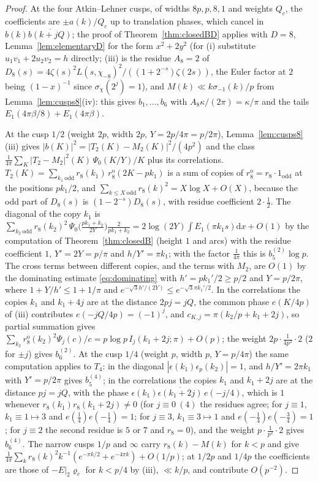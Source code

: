 \documentclass[11pt]{amsart}
\theoremstyle{remark}
\newcommand{\dd}{\mathrm{d}}
\begin{document}
\begin{proof}
At the four Atkin--Lehner cusps, of widths $8p,p,8,1$ and weights $Q_c$, the coefficients are $\pm a(k)/Q_c$ up to translation phases, which cancel in $b(k)\overline{b(k+jQ)}$; the proof of Theorem~\ref{thm:closedBD} applies with $D=8$, Lemma~\ref{lem:elementaryD} for the form $x^2+2y^2$ (for (i) substitute $u_1v_1+2u_2v_2=h$ directly; (iii) is the residue $A_8=2$ of $D_8(s)=4\zeta(s)^2L(s,\chi_{-8})^2/((1+2^{-s})\zeta(2s))$, the Euler factor at $2$ being $(1-x)^{-1}$ since $\sigma_\chi(2^j)=1$), and $M(k)\ll k\sigma_{-1}(k)/p$ from Lemma~\ref{lem:cusps8}(iv): this gives $b_1,\dots,b_6$ with $A_8\kappa/(2\pi)=\kappa/\pi$ and the tails $E_1(4\pi\beta/8)+E_1(4\pi\beta)$.

At the cusp $1/2$ (weight $2p$, width $2p$, $Y=2p/4\pi=p/2\pi$), Lemma~\ref{lem:cusps8}(iii) gives $|b(K)|^2=|T_2(K)-M_2(K)|^2/(4p^2)$ and the class $\frac1{4\pi}\sum_K|T_2-M_2|^2(K)\,\Psi_0(K/Y)/K$ plus its correlations. $T_2(K)=\sum_{k_1\ \mathrm{odd}}r_8(k_1)\,r_8^{\mathrm o}(2K-pk_1)$ is a sum of copies of $r_8^{\mathrm o}=r_8\cdot1_{\mathrm{odd}}$ at the positions $pk_1/2$, and $\sum_{k\le X\ \mathrm{odd}}r_8(k)^2=X\log X+O(X)$, because the odd part of $D_8(s)$ is $(1-2^{-s})D_8(s)$, with residue coefficient $2\cdot\frac12$. The diagonal of the copy $k_1$ is $\sum_{k_2\ \mathrm{odd}}r_8(k_2)^2\,\Psi_0\bigl(\frac{pk_1+k_2}{2Y}\bigr)\frac2{pk_1+k_2}=2\log(2Y)\int E_1(\pi k_1s)\dd x+O(1)$ by the computation of Theorem~\ref{thm:closedB} (height $1$ and arcs) with the residue coefficient $1$, $Y'=2Y=p/\pi$ and $h/Y'=\pi k_1$; with the factor $\frac1{4\pi}$ this is $b_5^{(2)}\log p$. The cross terms between different copies, and the terms with $M_2$, are $O(1)$ by the dominating estimate \eqref{eq:dominating} with $h'=pk_1'/2\ge p/2$ and $Y=p/2\pi$, where $1+Y/h'\le1+1/\pi$ and $e^{-\sqrt3h'/(2Y)}\le e^{-\sqrt3\pi k_1'/2}$. In the correlations the copies $k_1$ and $k_1+4j$ are at the distance $2pj=jQ$, the common phase $e(K/4p)$ of (iii) contributes $e(-jQ/4p)=(-1)^j$, and $c_{K,j}=\pi(k_2/p+k_1+2j)$, so partial summation gives $\sum_{k_2}r_8^{\mathrm o}(k_2)^2\Psi_j(c)/c=p\log p\,I_j(k_1+2j;\pi)+O(p)$; the weight $2p\cdot\frac1{4p^2}\cdot2$ ($2$ for $\pm j$) gives $b_6^{(2)}$. At the cusp $1/4$ (weight $p$, width $p$, $Y=p/4\pi$) the same computation applies to $T_4$: in the diagonal $|\epsilon(k_1)\epsilon_p(k_2)|=1$, and $h/Y'=2\pi k_1$ with $Y'=p/2\pi$ gives $b_5^{(4)}$; in the correlations the copies $k_1$ and $k_1+2j$ are at the distance $pj=jQ$, with the phase $\epsilon(k_1)\overline{\epsilon(k_1+2j)}\,e(-j/4)$, which is $1$ whenever $r_8(k_1)r_8(k_1+2j)\ne0$ (for $j\equiv0\ (4)$ the residues agree; for $j\equiv1$, $k_1\equiv1\mapsto3$ and $e(\frac14)e(-\frac14)=1$; for $j\equiv3$, $k_1\equiv3\mapsto1$ and $e(-\frac14)e(-\frac34)=1$; for $j\equiv2$ the second residue is $5$ or $7$ and $r_8=0$), and the weight $p\cdot\frac1{p^2}\cdot2$ gives $b_6^{(4)}$. The narrow cusps $1/p$ and $\infty$ carry $r_8(k)-M(k)$ for $k<p$ and give $\frac1{4\pi}\sum_kr_8(k)^2k^{-1}(e^{-\pi k/2}+e^{-4\pi k})+O(1/p)$; at $1/2p$ and $1/4p$ the coefficients are those of $-E|_2\varrho_c$ for $k<p/4$ by (iii), $\ll k/p$, and contribute $O(p^{-2})$.
\end{proof}
\end{document}
